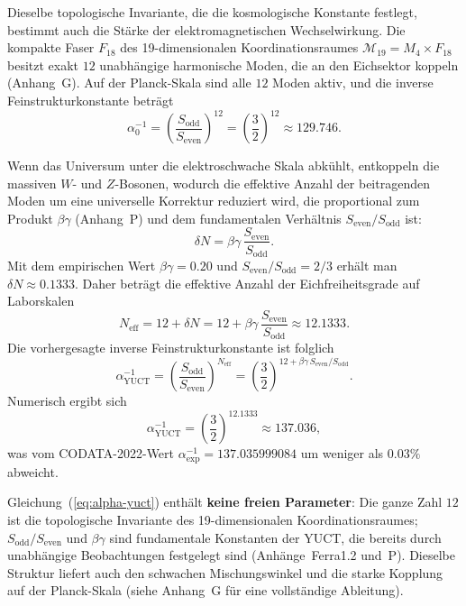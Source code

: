 \documentclass[12pt,a4paper]{article}
\begin{document}
	Dieselbe topologische Invariante, die die kosmologische Konstante festlegt, bestimmt auch
	die Stärke der elektromagnetischen Wechselwirkung.  Die kompakte Faser \(F_{18}\) des
	19-dimensionalen Koordinationsraumes \(\mathcal{M}_{19}=M_4\times F_{18}\) besitzt
	exakt \(12\) unabhängige harmonische Moden, die an den Eichsektor koppeln
	(Anhang~G).  Auf der Planck-Skala sind alle \(12\) Moden aktiv, und die inverse
	Feinstrukturkonstante beträgt
	\begin{equation}
		\alpha_0^{-1} = \left(\frac{S_{\mathrm{odd}}}{S_{\mathrm{even}}}\right)^{12}
		= \left(\frac{3}{2}\right)^{12} \approx 129.746 .
	\end{equation}
	
	Wenn das Universum unter die elektroschwache Skala abkühlt, entkoppeln die massiven \(W\)- und \(Z\)-Bosonen, wodurch die effektive Anzahl der beitragenden Moden um eine universelle
	Korrektur reduziert wird, die proportional zum Produkt \(\beta\gamma\) (Anhang~P) und dem
	fundamentalen Verhältnis \(S_{\mathrm{even}}/S_{\mathrm{odd}}\) ist:
	\begin{equation}
		\delta N = \beta\gamma \, \frac{S_{\mathrm{even}}}{S_{\mathrm{odd}}} .
	\end{equation}
	Mit dem empirischen Wert \(\beta\gamma = 0.20\) und \(S_{\mathrm{even}}/S_{\mathrm{odd}} = 2/3\)
	erhält man \(\delta N \approx 0.1333\).  Daher beträgt die effektive Anzahl der Eichfreiheitsgrade auf Laborskalen
	\begin{equation}
		N_{\mathrm{eff}} = 12 + \delta N = 12 + \beta\gamma\,\frac{S_{\mathrm{even}}}{S_{\mathrm{odd}}}
		\approx 12.1333 .
	\end{equation}
	Die vorhergesagte inverse Feinstrukturkonstante ist folglich
	\begin{equation}
		\boxed{\alpha^{-1}_{\mathrm{YUCT}} =
			\left(\frac{S_{\mathrm{odd}}}{S_{\mathrm{even}}}\right)^{N_{\mathrm{eff}}}
			= \left(\frac{3}{2}\right)^{12 + \beta\gamma\,S_{\mathrm{even}}/S_{\mathrm{odd}}} } .
		\label{eq:alpha-yuct}
	\end{equation}
	Numerisch ergibt sich
	\[
	\alpha^{-1}_{\mathrm{YUCT}} = \left(\frac{3}{2}\right)^{12.1333} \approx 137.036 ,
	\]
	was vom CODATA-2022-Wert \(\alpha^{-1}_{\mathrm{exp}} = 137.035999084\)
	um weniger als \(0.03\%\) abweicht.
	
	Gleichung~(\ref{eq:alpha-yuct}) enthält \textbf{keine freien Parameter}: Die ganze Zahl
	\(12\) ist die topologische Invariante des 19-dimensionalen Koordinationsraumes;
	\(S_{\mathrm{odd}}/S_{\mathrm{even}}\) und \(\beta\gamma\) sind fundamentale Konstanten
	der YUCT, die bereits durch unabhängige Beobachtungen festgelegt sind (Anhänge~Ferra1.2 und~P).
	Dieselbe Struktur liefert auch den schwachen Mischungswinkel und die starke Kopplung auf der
	Planck-Skala (siehe Anhang~G für eine vollständige Ableitung).
	
\end{document}
